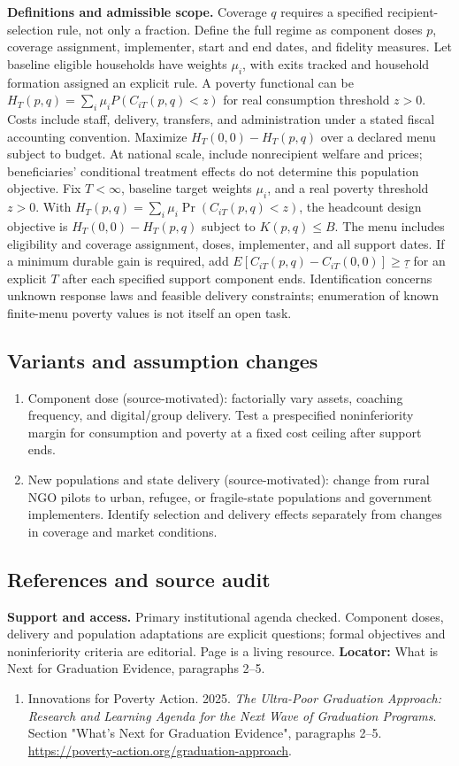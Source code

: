 \documentclass[11pt,a4paper]{article}
\begin{document}
\textbf{Definitions and admissible scope.} Coverage \(q\) requires a specified recipient-selection rule, not only a fraction. Define the full regime as component doses \(p\), coverage assignment, implementer, start and end dates, and fidelity measures. Let baseline eligible households have weights \(\mu_i\), with exits tracked and household formation assigned an explicit rule. A poverty functional can be \(H_T(p,q)=\sum_i\mu_iP(C_{iT}(p,q)<z)\) for real consumption threshold \(z>0\). Costs include staff, delivery, transfers, and administration under a stated fiscal accounting convention. Maximize \(H_T(0,0)-H_T(p,q)\) over a declared menu subject to budget. At national scale, include nonrecipient welfare and prices; beneficiaries' conditional treatment effects do not determine this population objective. Fix \(T<\infty\), baseline target weights \(\mu_i\), and a real poverty threshold \(z>0\). With \(H_T(p,q)=\sum_i\mu_i\Pr(C_{iT}(p,q)<z)\), the headcount design objective is \(H_T(0,0)-H_T(p,q)\) subject to \(K(p,q)\le B\). The menu includes eligibility and coverage assignment, doses, implementer, and all support dates. If a minimum durable gain is required, add \(E[C_{iT}(p,q)-C_{iT}(0,0)]\ge\underline\tau\) for an explicit \(T\) after each specified support component ends. Identification concerns unknown response laws and feasible delivery constraints; enumeration of known finite-menu poverty values is not itself an open task.
\subsection*{Variants and assumption changes}
\begin{enumerate}
\item Component dose (source-motivated): factorially vary assets, coaching frequency, and digital/group delivery. Test a prespecified noninferiority margin for consumption and poverty at a fixed cost ceiling after support ends.
\item New populations and state delivery (source-motivated): change from rural NGO pilots to urban, refugee, or fragile-state populations and government implementers. Identify selection and delivery effects separately from changes in coverage and market conditions.
\end{enumerate}
\subsection*{References and source audit}
\textbf{Support and access.} Primary institutional agenda checked. Component doses, delivery and population adaptations are explicit questions; formal objectives and noninferiority criteria are editorial. Page is a living resource. \textbf{Locator:} What is Next for Graduation Evidence, paragraphs 2--5.
\begin{enumerate}\raggedright
\item\hypertarget{definitions:source:30007653:1}{} Innovations for Poverty Action. 2025. \emph{The Ultra-Poor Graduation Approach: Research and Learning Agenda for the Next Wave of Graduation Programs}. Section "What’s Next for Graduation Evidence", paragraphs 2–5.
\url{https://poverty-action.org/graduation-approach}.
\end{enumerate}
\end{document}
